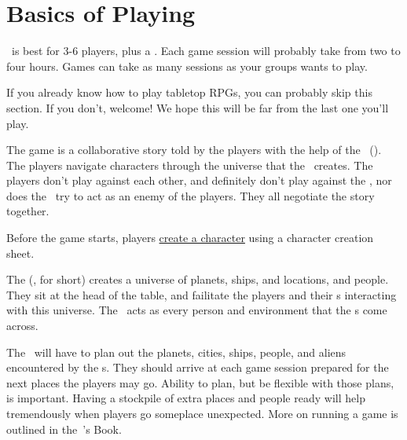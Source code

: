 \section{Basics of Playing}

\par
\getTitle\, is best for 3-6 players, plus a \gm . Each game session will probably take from two to four hours. Games can take as many sessions as your groups wants to play.

\par
If you already know how to play tabletop RPGs, you can probably skip this section. If you don't, welcome! We hope this will be far from the last one you'll play.

\par
The game is a collaborative story told by the players with the help of the \gmLong\, (\gm). The players navigate characters through the universe that the \gm\, creates. The players don't play against each other, and definitely don't play against the \gm , nor does the \gm\, try to act as an enemy of the players. They all negotiate the story together.

\par
Before the game starts, players \hyperlink{Character Creation}{create a character} using a character creation sheet.

\par
The \gmLong (\gm , for short) creates a universe of planets, ships, and locations, and people. They sit at the head of the table, and failitate the players and their \pc s interacting with this universe. The \gm\, acts as every person and environment that the \pc s come across.

\par
The \gm\, will have to plan out the planets, cities, ships, people, and aliens encountered by the \pc s. They should arrive at each game session prepared for the next places the players may go. Ability to plan, but be flexible with those plans, is important. Having a stockpile of extra places and people ready will help tremendously when players go someplace unexpected. More on running a game is outlined in the \getTitle\,\gm 's Book.